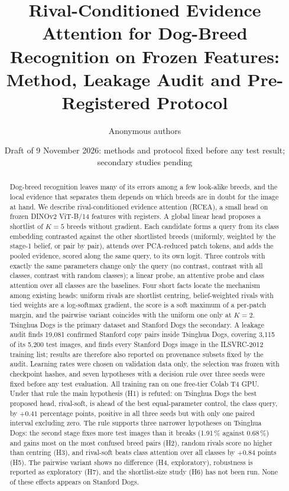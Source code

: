 \documentclass[11pt,a4paper]{article}
\title{Rival-Conditioned Evidence Attention for Dog-Breed Recognition on Frozen Features:\\
Method, Leakage Audit and Pre-Registered Protocol}
\author{Anonymous authors}
\date{Draft of 9 November 2026: methods and protocol fixed before any test result; secondary studies pending}
\theoremstyle{plain}
\begin{document}
\maketitle

\begin{abstract}
Dog-breed recognition leaves many of its errors among a few look-alike breeds, and the local evidence that
separates them depends on which breeds are in doubt for the image at hand. We describe rival-conditioned evidence
attention (RCEA), a small head on frozen DINOv2 ViT-B/14 features with registers. A global linear head proposes a
shortlist of $K=5$ breeds without gradient. Each candidate forms a query from its class embedding contrasted
against the other shortlisted breeds (uniformly, weighted by the stage-1 belief, or pair by pair), attends over
PCA-reduced patch tokens, and adds the pooled evidence, scored along the same query, to its own logit. Three
controls with exactly the same parameters change only the query (no contrast, contrast with all classes, contrast
with random classes); a linear probe, an attentive probe and class attention over all classes are the baselines.
Four short facts locate the mechanism among existing heads: uniform rivals are shortlist centring, belief-weighted
rivals with tied weights are a log-softmax gradient, the score is a soft maximum of a per-patch margin, and the
pairwise variant coincides with the uniform one only at $K=2$. Tsinghua Dogs is the primary dataset and Stanford
Dogs the secondary. A leakage audit finds 19,081 confirmed Stanford copy pairs inside Tsinghua Dogs, covering 3,115
of its 5,200 test images, and finds every Stanford Dogs image in the ILSVRC-2012 training list; results are
therefore also reported on provenance subsets fixed by the audit. Learning rates were chosen on validation data
only, the selection was frozen with checkpoint hashes, and seven hypotheses with a decision rule over three seeds
were fixed before any test evaluation. All training ran on one free-tier Colab T4 GPU.
Under that rule the main hypothesis (H1) is refuted: on Tsinghua Dogs the best proposed head, rival-soft, is ahead
of the best equal-parameter control, the class query, by $+0.41$ percentage points, positive in all three seeds but
with only one paired interval excluding zero. The rule supports three narrower hypotheses on Tsinghua Dogs: the
second stage fixes more test images than it breaks (1.91\,\% against 0.68\,\%) and gains most on the most confused
breed pairs (H2), random rivals score no higher than centring (H3), and rival-soft beats class attention over all
classes by $+0.84$ points (H5). The pairwise variant shows no difference (H4, exploratory), robustness is reported as
exploratory (H7), and the shortlist-size study (H6) has not been run. None of these effects appears on Stanford Dogs.
\end{abstract}
\end{document}
